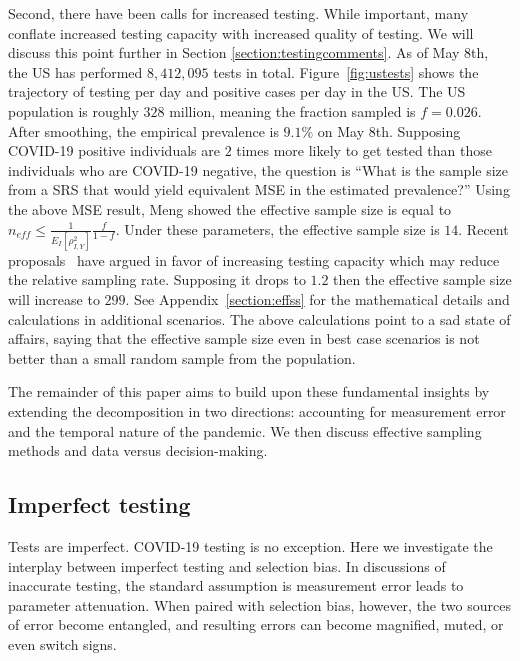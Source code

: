 \documentclass[aoas]{amsart}
\begin{document}
Second, there have been calls for increased testing.  While important, many conflate increased testing capacity with increased quality of testing.  We will discuss this point further in Section \ref{section:testingcomments}.  As of May 8th, the US has performed $8,412,095$ tests in total.  Figure~\ref{fig:ustests} shows the trajectory of testing per day and positive cases per day in the US.  The US population is roughly $328$ million, meaning the fraction sampled is $f = 0.026$.  After smoothing, the empirical prevalence is $9.1\%$ on May 8th.  Supposing COVID-19 positive individuals are $2$ times more likely to get tested than those individuals who are COVID-19 negative, the question is ``What is the sample size from a SRS that would yield equivalent MSE in the estimated prevalence?'' Using the above MSE result, Meng showed the effective sample size is equal to $n_{eff} \leq \frac{1}{E_I [ \rho_{I,Y}^2 ]} \frac{f}{1-f}$.  Under these parameters, the effective sample size is $14$.  Recent proposals~\citep{Siddarth2020} have argued in favor of increasing testing capacity which may reduce the relative sampling rate.  Supposing it drops to $1.2$ then the effective sample size will increase to $299$.  See Appendix~\ref{section:effss} for the mathematical details and calculations in additional scenarios.   The above calculations point to a sad state of affairs, saying that the effective sample size even in best case scenarios is not better than a small random sample from the population.

The remainder of this paper aims to build upon these fundamental insights by extending the decomposition in two directions: accounting for  measurement error and the temporal nature of the pandemic.  We then discuss effective sampling methods and data versus decision-making.

\subsection{Imperfect testing}

Tests are imperfect.  COVID-19 testing is no exception. Here we investigate the interplay between imperfect testing and selection bias.  In discussions of inaccurate testing, the standard assumption is measurement error leads to parameter attenuation.  When paired with selection bias, however, the two sources of error become entangled, and resulting errors can become magnified, muted, or even switch signs.
\end{document}
